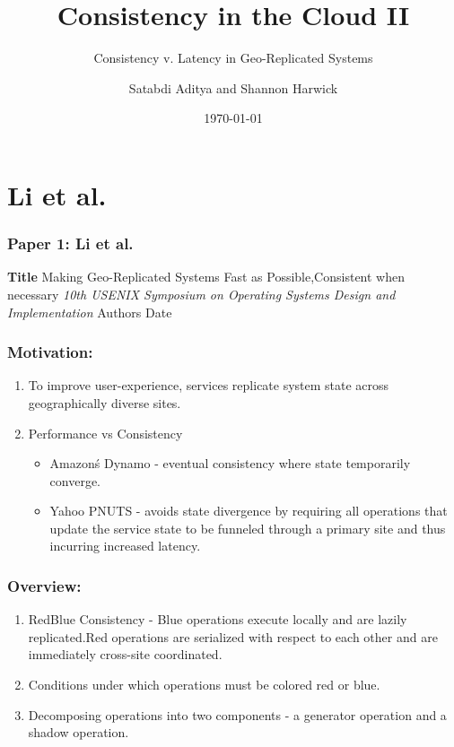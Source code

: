 \documentclass{beamer}
\title{Consistency in the Cloud II}
\subtitle{Consistency v. Latency in Geo-Replicated Systems}
\author{Satabdi Aditya and Shannon Harwick}
\institute{University of Illinois at Chicago}
\date{\today}
\begin{document}

\section{Li et al.} 

\begin{frame}
\frametitle{Paper 1: Li et al.}

\textbf{Title} Making Geo-Replicated Systems Fast as Possible,Consistent when necessary\newline
\textit{10th USENIX Symposium on Operating Systems Design and Implementation} \newline
Authors\newline
Date\newline

\end{frame}


\begin{frame}
\frametitle{Motivation:}
\begin{enumerate}
\item To improve user-experience, services replicate  system state across geographically diverse sites.
\item Performance vs Consistency
\begin{itemize}
\item Amazon\'s Dynamo - eventual consistency where state temporarily converge.
\item Yahoo PNUTS - avoids state divergence by requiring all operations that update the service state to be funneled through a primary site and thus incurring increased latency.
\end{itemize}
\end{enumerate}

\end{frame}



\begin{frame}
\frametitle{Overview:}
\begin{enumerate}
\item RedBlue Consistency - Blue operations execute locally and are lazily replicated.Red operations are serialized with respect to each other and are immediately cross-site coordinated.
\item Conditions under which operations must be colored red or blue.
\item Decomposing operations into two components - a generator operation and a shadow operation.
\end{enumerate}

\end{frame}
\end{document}
